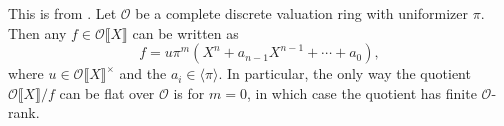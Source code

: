 \documentclass{amsart}
\newcommand{\cO}{\mathcal{O}}
\begin{document}
This is from \cite[VII \S 3.8, pr.6]{bourbaki-comm-alg}. Let $\cO$ be a 
complete discrete valuation ring with uniformizer $\pi$. Then any 
$f\in \cO\llbracket X\rrbracket$ can be written as 
\[
  f = u \pi^m \left(X^n+a_{n-1} X^{n-1} + \cdots + a_0\right),
\]
where $u\in \cO\llbracket X\rrbracket^\times$ and the 
$a_i\in \langle \pi\rangle$. In particular, the only way the quotient 
$\cO\llbracket X\rrbracket/f$ can be flat over $\cO$ is for 
$m=0$, in which case the quotient has finite $\cO$-rank. 







\end{document}
